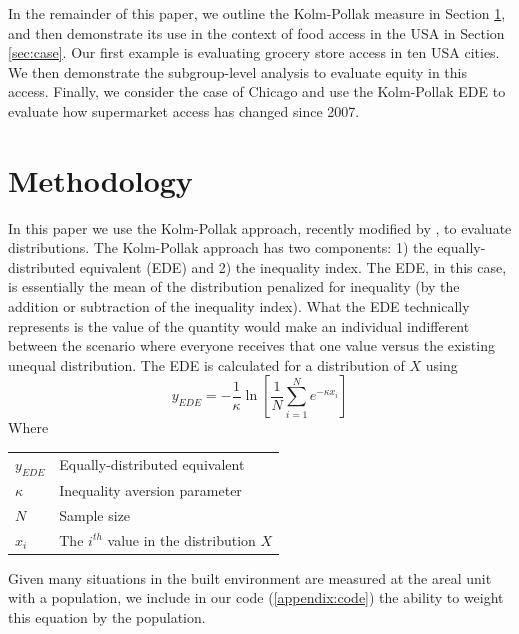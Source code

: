 \documentclass[final,3p,times,onecolumn,sort&compress]{elsarticle}
\makeatletter
\newenvironment{conditions}
  {\par\vspace{\abovedisplayskip}\noindent\begin{tabular}{>{$}l<{$} @{${}={}$} l}}
  {\end{tabular}\par\vspace{\belowdisplayskip}}
\makeatother
\begin{document}
In the remainder of this paper, we outline the Kolm-Pollak measure in Section \ref{sec:method}, and then demonstrate its use in the context of food access in the USA in Section \ref{sec:case}.
Our first example is evaluating grocery store access in ten USA cities.
We then demonstrate the subgroup-level analysis to evaluate equity in this access.
Finally, we consider the case of Chicago and use the Kolm-Pollak EDE to evaluate how supermarket access has changed since 2007.

\section{Methodology}
\label{sec:method}
In this paper we use the Kolm-Pollak approach, recently modified by \cite{Sheriff2020-ge}, to evaluate distributions.
The Kolm-Pollak approach has two components: 1) the equally-distributed equivalent (EDE) and 2) the inequality index.
The EDE, in this case, is essentially the mean of the distribution penalized for inequality (by the addition or subtraction of the inequality index).
What the EDE technically represents is the value of the quantity would make an individual indifferent between the scenario where everyone receives that one value versus the existing unequal distribution.
The EDE is calculated for a distribution of $X$ using \citep{Sheriff2020-ge}
\begin{equation}
    y_{EDE} = -\frac{1}{\kappa} \ln \left[ \frac{1}{N} \sum_{i=1}^{N} e ^ {-\kappa x_i} \right]
\end{equation}
Where
\begin{conditions}
     y_{EDE}  & Equally-distributed equivalent\\
     \kappa &  Inequality aversion parameter\\   
     N & Sample size \\   
     x_i & The $i^{th}$ value in the distribution $X$ \\
\end{conditions}
Given many situations in the built environment are measured at the areal unit with a population, we include in our code (\ref{appendix:code}) the ability to weight this equation by the population.
\end{document}
